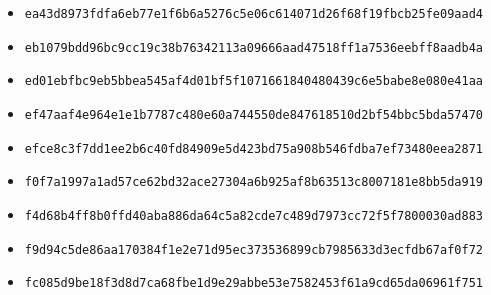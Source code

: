 {\begin{itemize}
    \item \texttt{ea43d8973fdfa6eb77e1f6b6a5276c5e06c614071d26f68f19fbcb25fe09aad4}
    \item \texttt{eb1079bdd96bc9cc19c38b76342113a09666aad47518ff1a7536eebff8aadb4a}
    \item \texttt{ed01ebfbc9eb5bbea545af4d01bf5f1071661840480439c6e5babe8e080e41aa}
    \item \texttt{ef47aaf4e964e1e1b7787c480e60a744550de847618510d2bf54bbc5bda57470}
    \item \texttt{efce8c3f7dd1ee2b6c40fd84909e5d423bd75a908b546fdba7ef73480eea2871}
    \item \texttt{f0f7a1997a1ad57ce62bd32ace27304a6b925af8b63513c8007181e8bb5da919}
    \item \texttt{f4d68b4ff8b0ffd40aba886da64c5a82cde7c489d7973cc72f5f7800030ad883}
    \item \texttt{f9d94c5de86aa170384f1e2e71d95ec373536899cb7985633d3ecfdb67af0f72}
    \item \texttt{fc085d9be18f3d8d7ca68fbe1d9e29abbe53e7582453f61a9cd65da06961f751}
\end{itemize}
}
